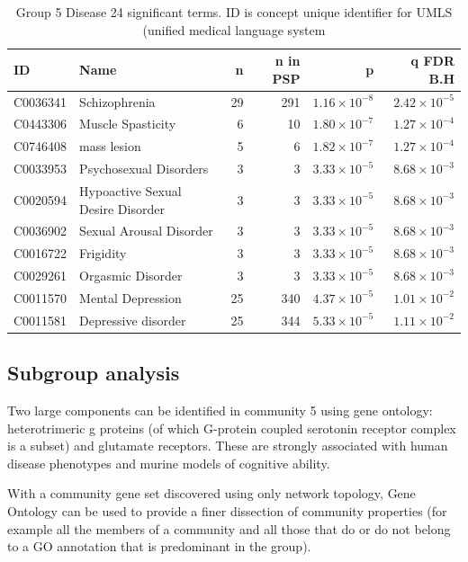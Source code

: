 \begin{table}[ht]
\centering
\begin{tabular}{llrrrr}
  \toprule
ID & Name & n & n in PSP & p & q FDR B.H \\ 
  \midrule
C0036341 & Schizophrenia & 29 & 291 & $1.16 \times 10^{-8}$ & $2.42 \times 10^{-5}$ \\ 
  C0443306 & Muscle Spasticity & 6 & 10 & $1.80 \times 10^{-7}$ & $1.27 \times 10^{-4}$ \\ 
  C0746408 & mass lesion & 5 & 6 & $1.82 \times 10^{-7}$ & $1.27 \times 10^{-4}$ \\ 
  C0033953 & Psychosexual Disorders & 3 & 3 & $3.33 \times 10^{-5}$ & $8.68 \times 10^{-3}$ \\ 
  C0020594 & Hypoactive Sexual Desire Disorder & 3 & 3 & $3.33 \times 10^{-5}$ & $8.68 \times 10^{-3}$ \\ 
  C0036902 & Sexual Arousal Disorder & 3 & 3 & $3.33 \times 10^{-5}$ & $8.68 \times 10^{-3}$ \\ 
  C0016722 & Frigidity & 3 & 3 & $3.33 \times 10^{-5}$ & $8.68 \times 10^{-3}$ \\ 
  C0029261 & Orgasmic Disorder & 3 & 3 & $3.33 \times 10^{-5}$ & $8.68 \times 10^{-3}$ \\ 
  C0011570 & Mental Depression & 25 & 340 & $4.37 \times 10^{-5}$ & $1.01 \times 10^{-2}$ \\ 
  C0011581 & Depressive disorder & 25 & 344 & $5.33 \times 10^{-5}$ & $1.11 \times 10^{-2}$ \\ 
   \bottomrule
\end{tabular}
\caption{Group 5 Disease 24 significant terms. ID is concept unique identifier for UMLS (unified medical language system} 
\label{tab:Group 5 Disease 24 significant terms}
\end{table}
\subsection{Subgroup analysis}
Two large components can be identified in community 5 using gene ontology: heterotrimeric g proteins (of which G-protein coupled serotonin receptor complex is a subset) and glutamate receptors. These are strongly associated with human disease phenotypes and murine models of cognitive ability.

With a community gene set discovered using only network topology, Gene Ontology can be used to provide a finer dissection of community properties (for example all the members of a community and all those that do or do not belong to a GO annotation that is predominant in the group).

